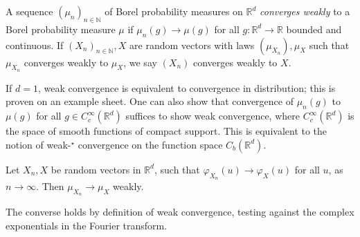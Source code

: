 \begin{definition}
	A sequence \( (\mu_n)_{n \in \mathbb N} \) of Borel probability measures on \( \mathbb R^d \) \emph{converges weakly} to a Borel probability measure \( \mu \) if \( \mu_n(g) \to \mu(g) \) for all \( g \colon \mathbb R^d \to \mathbb R \) bounded and continuous.
	If \( (X_n)_{n \in \mathbb N}, X \) are random vectors with laws \( (\mu_{X_n}), \mu_X \) such that \( \mu_{X_n} \) converges weakly to \( \mu_X \), we say \( (X_n) \) converges weakly to \( X \).
\end{definition}
\begin{remark}
	If \( d = 1 \), weak convergence is equivalent to convergence in distribution; this is proven on an example sheet.
	One can also show that convergence of \( \mu_n(g) \) to \( \mu(g) \) for all \( g \in C_c^\infty(\mathbb R^d) \) suffices to show weak convergence, where \( C_c^\infty(\mathbb R^d) \) is the space of smooth functions of compact support.
	This is equivalent to the notion of weak-\( {}^\star \) convergence on the function space \( C_b(\mathbb R^d) \).
\end{remark}
\begin{theorem}
	Let \( X_n, X \) be random vectors in \( \mathbb R^d \), such that \( \varphi_{X_n}(u) \to \varphi_X(u) \) for all \( u \), as \( n \to \infty \).
	Then \( \mu_{X_n} \to \mu_X \) weakly.
\end{theorem}
\begin{remark}
	The converse holds by definition of weak convergence, testing against the complex exponentials in the Fourier transform.
\end{remark}

